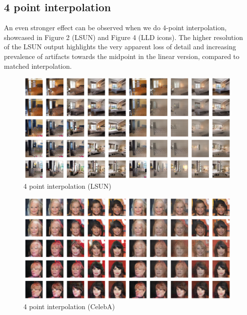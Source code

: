 \documentclass{article}
\begin{document}
\subsection{4 point interpolation}
An even stronger effect can be observed when we do 4-point interpolation,
showcased in Figure 2 (LSUN) and Figure 4 (LLD icons). The higher resolution of the LSUN output highlights the very apparent loss of detail and increasing prevalence of artifacts towards the midpoint in the linear version, compared to matched interpolation.



\begin{center}
\begin{figure}
    \includegraphics[width=\linewidth]{CelebA/images/LSUN_int4_1.png}
    \caption{4 point interpolation (LSUN)}
\end{figure}
\end{center}

\begin{center}
\begin{figure}
    \includegraphics[width=\linewidth]{CelebA/images/CelebA_int4_2.png}
    \caption{4 point interpolation (CelebA)}
\end{figure}
\end{center}
\end{document}
